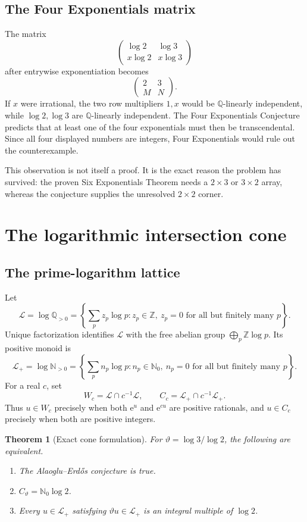 \documentclass[11pt,oneside]{article}
\newtheorem{theorem}{Theorem}[section]
\theoremstyle{definition}
\newcommand{\Q}{\mathbb{Q}}
\newcommand{\Z}{\mathbb{Z}}
\newcommand{\N}{\mathbb{N}}
\newcommand{\ee}{\mathrm{e}}
\newcommand{\cL}{\mathscr{L}}
\begin{document}
\subsection{The Four Exponentials matrix}

The matrix
\[
   \begin{pmatrix}
      \log 2 & \log 3\\
      x\log 2 & x\log 3
   \end{pmatrix}
\]
after entrywise exponentiation becomes
\[
   \begin{pmatrix}
      2 & 3\\
      M & N
   \end{pmatrix}.
\]
If $x$ were irrational, the two row multipliers $1,x$ would be $\Q$-linearly independent, while $\log2,\log3$ are $\Q$-linearly independent.  The Four Exponentials Conjecture predicts that at least one of the four exponentials must then be transcendental.  Since all four displayed numbers are integers, Four Exponentials would rule out the counterexample.

This observation is not itself a proof.  It is the exact reason the problem has survived: the proven Six Exponentials Theorem needs a $2\times3$ or $3\times2$ array, whereas the conjecture supplies the unresolved $2\times2$ corner.

\section{The logarithmic intersection cone}

\subsection{The prime-logarithm lattice}

Let
\[
  \cL=\log\Q_{>0}
  =\left\{\sum_{p}z_p\log p:
       z_p\in\Z,\ z_p=0\text{ for all but finitely many }p\right\}.
\]
Unique factorization identifies $\cL$ with the free abelian group
$\bigoplus_p\Z\log p$.  Its positive monoid is
\[
  \cL_+=\log\N_{>0}
  =\left\{\sum_p n_p\log p:n_p\in\N_0,
       \ n_p=0\text{ for all but finitely many }p\right\}.
\]
For a real $c$, set
\[
   W_c=\cL\cap c^{-1}\cL,
   \qquad
   C_c=\cL_+\cap c^{-1}\cL_+.
\]
Thus $u\in W_c$ precisely when both $\ee^u$ and $\ee^{cu}$ are positive rationals, and $u\in C_c$ precisely when both are positive integers.

\begin{theorem}[Exact cone formulation]\label{thm:cone}
For $\vartheta=\log3/\log2$, the following are equivalent.
\begin{enumerate}[label=\textup{(\alph*)}]
\item The Alaoglu--Erd\H{o}s conjecture is true.
\item $C_{\vartheta}=\N_0\log2$.
\item Every $u\in\cL_+$ satisfying $\vartheta u\in\cL_+$ is an integral multiple of $\log2$.
\end{enumerate}
\end{theorem}
\end{document}
